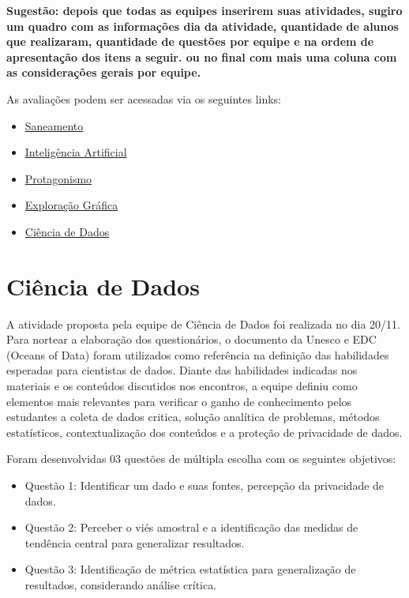 \documentclass[
]{book}
\providecommand{\tightlist}{%
  \setlength{\itemsep}{0pt}\setlength{\parskip}{0pt}}
\begin{document}
\textbf{Sugestão: depois que todas as equipes inserirem suas atividades, sugiro um quadro com as informações dia da atividade, quantidade de alunos que realizaram, quantidade de questões por equipe e na ordem de apresentação dos itens a seguir. ou no final com mais uma coluna com as considerações gerais por equipe.}

As avaliações podem ser acessadas via os seguintes links:

\begin{itemize}
\tightlist
\item
  \href{https://docs.google.com/forms/d/1xAr6bonRjfJumIGB_0SHndqAAqJ2bLBUvWLZAh8doFw/edit}{Saneamento}
\item
  \href{https://docs.google.com/forms/d/18AF3aKUOceI_BEmef9ZFq-KJq9n-a97SgLRkW8s8RKI/edit}{Inteligência Artificial}
\item
  \href{https://docs.google.com/forms/d/18WCwc6q87M9FTeV8u-pWQAvbOcSR02130lpMXvseiFI/edit}{Protagonismo}
\item
  \href{https://docs.google.com/forms/d/1mIdDxZklOGfIrCCBrHdZXoSSdrSyk2oeovmwcBB274s/edit}{Exploração Gráfica}
\item
  \href{https://docs.google.com/forms/d/13kIWrOCiosreMTk-sXc7PzOLZ52mRJgGKwV1s_dQqlE/edit}{Ciência de Dados}
\end{itemize}

\hypertarget{ciuxeancia-de-dados-1}{%
\section{Ciência de Dados}\label{ciuxeancia-de-dados-1}}

A atividade proposta pela equipe de Ciência de Dados foi realizada no dia 20/11. Para nortear a elaboração dos questionários, o documento da Unesco e EDC (Oceans of Data) foram utilizados como referência na definição das habilidades esperadas para cientistas de dados. Diante das habilidades indicadas nos materiais e os conteúdos discutidos nos encontros, a equipe definiu como elementos mais relevantes para verificar o ganho de conhecimento pelos estudantes a coleta de dados critica, solução analítica de problemas, métodos estatísticos, contextualização dos conteúdos e a proteção de privacidade de dados.

Foram desenvolvidas 03 questões de múltipla escolha com os seguintes objetivos:

\begin{itemize}
\tightlist
\item
  Questão 1: Identificar um dado e suas fontes, percepção da privacidade de dados.\\
\item
  Questão 2: Perceber o viés amostral e a identificação das medidas de tendência central para generalizar resultados.
\item
  Questão 3: Identificação de métrica estatística para generalização de resultados, considerando análise crítica.
\end{itemize}
\end{document}
